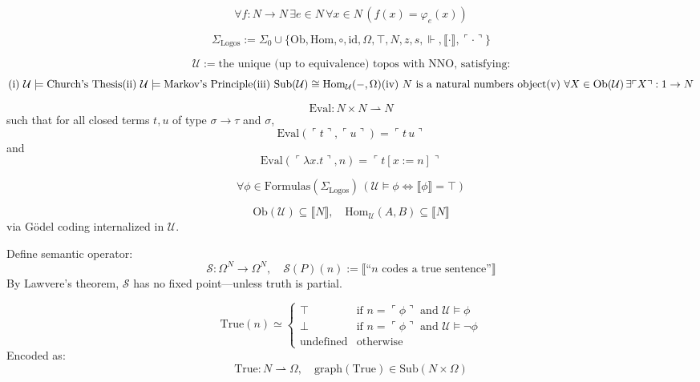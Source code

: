 \documentclass{article}
\begin{document}
\[
\forall f : N \to N \, \exists e \in N \, \forall x \in N \, (f(x) = \varphi_e(x))
\]


\[
\Sigma_{\text{Logos}} := \Sigma_0 \cup \{ \text{Ob}, \text{Hom}, \circ, \text{id}, \Omega, \top, N, z, s, \Vdash, \llbracket \cdot \rrbracket, \ulcorner \cdot \urcorner \}
\]

\[
\mathcal{U} := \text{the unique (up to equivalence) topos with NNO, satisfying:}
\]
\[
\text{(i) } \mathcal{U} \models \text{Church's Thesis} \\
\text{(ii) } \mathcal{U} \models \text{Markov's Principle} \\
\text{(iii) } \text{Sub}(\mathcal{U}) \cong \text{Hom}_{\mathcal{U}}(-, \Omega) \\
\text{(iv) } N \text{ is a natural numbers object} \\
\text{(v) } \forall X \in \text{Ob}(\mathcal{U}) \, \exists \ulcorner X \urcorner : 1 \to N
\]

\[
\text{Eval} : N \times N \rightharpoonup N
\]
such that for all closed terms $t, u$ of type $\sigma \to \tau$ and $\sigma$,
\[
\text{Eval}(\ulcorner t \urcorner, \ulcorner u \urcorner) = \ulcorner t \, u \urcorner
\]
and
\[
\text{Eval}(\ulcorner \lambda x . t \urcorner, n) = \ulcorner t[x := n] \urcorner
\]

\[
\forall \phi \in \text{Formulas}(\Sigma_{\text{Logos}}) \, \left( \mathcal{U} \models \phi \Leftrightarrow \llbracket \phi \rrbracket = \top \right)
\]

\[
\text{Ob}(\mathcal{U}) \subseteq \llbracket N \rrbracket, \quad \text{Hom}_{\mathcal{U}}(A, B) \subseteq \llbracket N \rrbracket
\]
via Gödel coding internalized in $\mathcal{U}$.

Define semantic operator:
\[
\mathcal{S} : \Omega^N \to \Omega^N, \quad \mathcal{S}(P)(n) := \llbracket \text{``} n \text{ codes a true sentence''} \rrbracket
\]
By Lawvere’s theorem, $\mathcal{S}$ has no fixed point—unless truth is partial.

\[
\text{True}(n) \simeq \begin{cases}
\top & \text{if } n = \ulcorner \phi \urcorner \text{ and } \mathcal{U} \models \phi \\
\bot & \text{if } n = \ulcorner \phi \urcorner \text{ and } \mathcal{U} \models \neg \phi \\
\text{undefined} & \text{otherwise}
\end{cases}
\]
Encoded as:
\[
\text{True} : N \rightharpoonup \Omega, \quad \text{graph}(\text{True}) \in \text{Sub}(N \times \Omega)
\]
\end{document}
